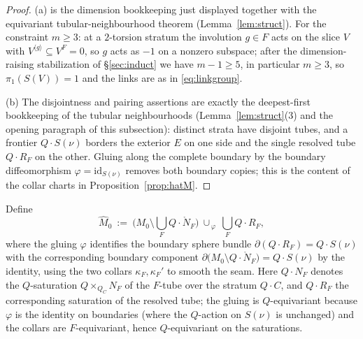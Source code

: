 \documentclass[12pt]{article}
\theoremstyle{definition}
\begin{document}
\begin{proof}
(a) is the dimension bookkeeping just displayed together with the equivariant
tubular-neighbourhood theorem (Lemma~\ref{lem:struct}). For the constraint
$m\ge 3$: at a $2$-torsion stratum the involution $g\in F$ acts on the slice
$V$ with $V^{\langle g\rangle}\subseteq V^F=0$, so $g$ acts as $-1$ on a
nonzero subspace; after the dimension-raising stabilization of
\S\ref{sec:induct} we have $m-1\ge 5$, in particular $m\ge 3$, so
$\pi_1(S(V))=1$ and the links are as in \eqref{eq:linkgroup}.

(b) The disjointness and pairing assertions are exactly the deepest-first
bookkeeping of the tubular neighbourhoods (Lemma~\ref{lem:struct}(3) and the
opening paragraph of this subsection): distinct strata have disjoint tubes, and a
frontier $Q\cdot S(\nu)$ borders the exterior $E$ on one side and the single
resolved tube $Q\cdot R_F$ on the other. Gluing along the complete boundary by
the boundary diffeomorphism $\varphi=\mathrm{id}_{S(\nu)}$ removes both boundary
copies; this is the content of the collar charts in
Proposition~\ref{prop:hatM}.
\end{proof}

Define
\[
   \widehat M_0\ :=\ \Big(M_0\setminus\textstyle\bigcup_F Q\!\cdot\!\mathring N_F\Big)
   \ \cup_{\,\varphi}\ \textstyle\bigcup_F Q\!\cdot\! R_F,
\]
where the gluing $\varphi$ identifies the boundary sphere bundle
$\partial(Q\cdot R_F)=Q\cdot S(\nu)$ with the corresponding boundary component
$\partial\big(M_0\setminus Q\cdot\mathring N_F\big)=Q\cdot S(\nu)$ by the
identity, using the two collars $\kappa_F,\kappa_F'$ to smooth the seam. Here
$Q\cdot N_F$ denotes the $Q$-saturation $Q\times_{Q_C}N_F$ of the $F$-tube over
the stratum $Q\cdot C$, and $Q\cdot R_F$ the corresponding saturation of the
resolved tube; the gluing is $Q$-equivariant because $\varphi$ is the identity on
boundaries (where the $Q$-action on $S(\nu)$ is unchanged) and the collars are
$F$-equivariant, hence $Q$-equivariant on the saturations.
\end{document}
